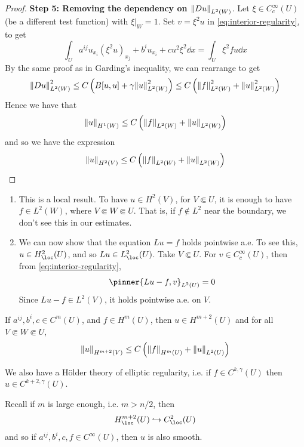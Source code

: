 \documentclass{article}
\begin{document}
\begin{proof}
    \textbf{Step 5: Removing the dependency on \(\norm{Du}_{L^2(W)}\)}. Let \(\xi \in C_c^\infty(U)\) (be a different test function) with \(\xi\vert_W = 1\). Set \(v = \xi^2 u\) in \cref{eq:interior-regularity}, to get
    \[\int_U a^{ij}u_{x_i}(\xi^2u)_{x_j} + b^iu_{x_i} + cu^2\xi^2\dd x = \int_U \xi^2 fu \dd x\]
    By the same proof as in Garding's inequality, we can rearrange to get
    \[\norm{Du}^2_{L^2(W)} \le C\left(B[u, u] + \gamma\norm{u}^2_{L^2(W)}\right) \le C\left(\norm{f}^2_{L^2(W)} + \norm{u}^2_{L^2(W)}\right)\]
    Hence we have that
    \[\norm{u}_{H^1(W)} \le C\left(\norm{f}_{L^2(W)} + \norm{u}_{L^2(W)}\right)\]
    and so we have the expression
    \[\norm{u}_{H^2(V)} \le C\left(\norm{f}_{L^2(W)} + \norm{u}_{L^2(W)}\right)\]
\end{proof}

\begin{remark}
    \begin{enumerate}
        \item This is a local result. To have \(u \in H^2(V)\), for \(V \Subset U\), it is enough to have \(f \in L^2(W)\), where \(V \Subset W \Subset U\). That is, if \(f\notin L^2\) near the boundary, we don't see this in our estimates.
        \item We can now show that the equation \(Lu = f\) holds pointwise a.e. To see this, \(u \in H^2_\loc(U)\), and so \(Lu \in L^2_\loc(U)\). Take \(V \Subset U\). For \(v \in C_c^\infty(U)\), then from \cref{eq:interior-regularity},
        \[\pinner{Lu - f, v}_{L^2(U)}= 0\]
        Since \(Lu - f \in L^2(V)\), it holds pointwise a.e. on \(V\).
    \end{enumerate}
\end{remark}

\begin{theorem}
    If \(a^{ij}, b^i, c \in C^m(U)\), and \(f \in H^m(U)\), then \(u \in H^{m+2}(U)\) and for all \(V \Subset W \Subset U\),
    \[\norm{u}_{H^{m+2}(V)} \le C\left(\norm{f}_{H^m(U)} + \norm{u}_{L^2(U)}\right)\]
\end{theorem}

\begin{remark}
    We also have a H\"older theory of elliptic regularity, i.e. if \(f \in C^{k, \gamma}(U)\) then \(u \in C^{k+2, \gamma}(U)\).
\end{remark}

\lec

\begin{remark}
    Recall if \(m\) is large enough, i.e. \(m > n/2\), then
    \[H^{m+2}_\loc(U) \inj C^2_\loc(U)\]
    and so if \(a^{ij}, b^i, c, f \in C^\infty(U)\), then \(u\) is also smooth.
\end{remark}
\end{document}
